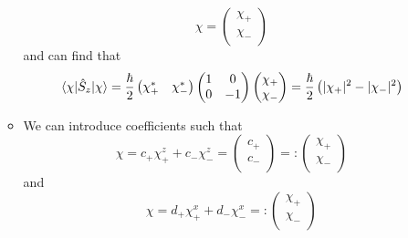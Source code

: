\documentclass[../notes.tex]{subfiles}
\begin{document}
\begin{itemize}
\begin{itemize}
        \begin{equation*}
            \chi =
            \begin{pmatrix}
                \chi_+\\
                \chi_-\\
            \end{pmatrix}
        \end{equation*}
        and can find that
        \begin{equation*}
            \ev{\hat{S}_z}{\chi} = \frac{\hbar}{2}
            \begin{pmatrix}
                \chi_+^* & \chi_-^*\\
            \end{pmatrix}
            \begin{pmatrix}
                1 & 0\\
                0 & -1\\
            \end{pmatrix}
            \begin{pmatrix}
                \chi_+\\
                \chi_-\\
            \end{pmatrix}
            = \frac{\hbar}{2}\left( |\chi_+|^2-|\chi_-|^2 \right)
        \end{equation*}
        \item We can introduce coefficients such that
        \begin{equation*}
            \chi = c_+\chi_+^z+c_-\chi_-^z
            =
            \begin{pmatrix}
                c_+\\
                c_-\\
            \end{pmatrix}
            =:
            \begin{pmatrix}
                \chi_+\\
                \chi_-\\
            \end{pmatrix}
        \end{equation*}
        and
        \begin{equation*}
            \chi = d_+\chi_+^x+d_-\chi_-^x
            =:
            \begin{pmatrix}
                \chi_+\\
                \chi_-\\
            \end{pmatrix}

\end{equation*}
\end{itemize}
\end{itemize}
\end{document}
